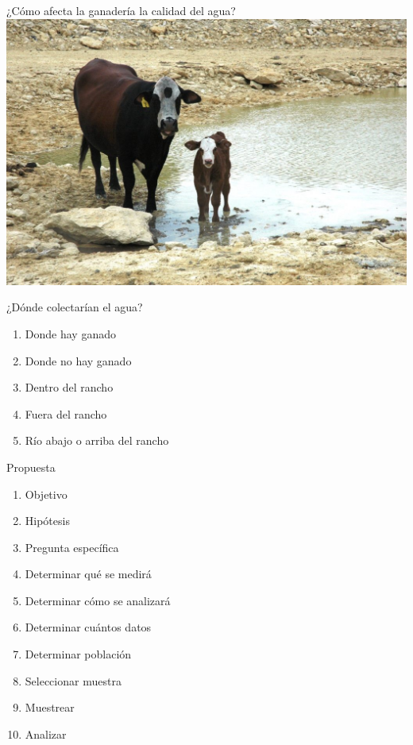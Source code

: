 \documentclass[
  11pt,
  ignorenonframetext,
]{beamer}
\providecommand{\tightlist}{%
  \setlength{\itemsep}{0pt}\setlength{\parskip}{0pt}}
\begin{document}
\begin{frame}{¿Cómo afecta la ganadería la calidad del agua?}
\protect\hypertarget{cuxf3mo-afecta-la-ganaderuxeda-la-calidad-del-agua}{}
\includegraphics{Figuras-Intro/Cattle-water.jpg}
\end{frame}

\begin{frame}{¿Dónde colectarían el agua?}
\protect\hypertarget{duxf3nde-colectaruxedan-el-agua}{}
\begin{enumerate}
\tightlist
\item
  Donde hay ganado
\item
  Donde no hay ganado
\item
  Dentro del rancho
\item
  Fuera del rancho
\item
  Río abajo o arriba del rancho
\end{enumerate}
\end{frame}

\begin{frame}{Propuesta}
\protect\hypertarget{propuesta}{}
\begin{enumerate}
\tightlist
\item
  Objetivo
\item
  Hipótesis
\item
  Pregunta específica
\item
  Determinar qué se medirá
\item
  Determinar cómo se analizará
\item
  Determinar cuántos datos
\item
  Determinar población
\item
  Seleccionar muestra
\item
  Muestrear
\item
  Analizar
\end{enumerate}
\end{frame}
\end{document}
